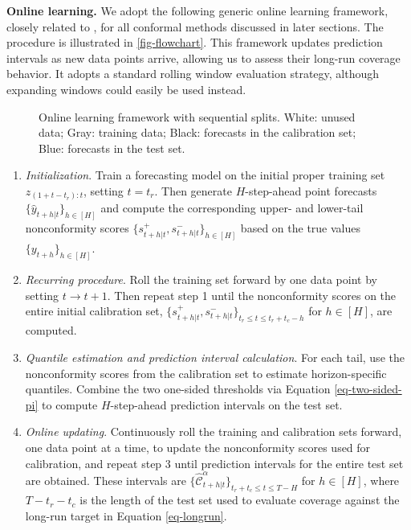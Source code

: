 \documentclass[
  american,
  12pt]{article}
\theoremstyle{plain}
\theoremstyle{plain}
\theoremstyle{remark}
\begin{document}
\textbf{Online learning.} We adopt the following generic online learning
framework, closely related to \citet{zaffran2022}, for all conformal
methods discussed in later sections. The procedure is illustrated in
\autoref{fig-flowchart}. This framework updates prediction intervals as
new data points arrive, allowing us to assess their long-run coverage
behavior. It adopts a standard rolling window evaluation strategy,
although expanding windows could easily be used instead.

\begin{figure}[!hbtp]
\vspace*{-1.5cm}
\hspace*{-2.5cm}
\centering
\scalebox{0.85}{
  
}
\vspace*{-0.5cm}

\caption{Online learning framework with sequential splits. White: unused data; Gray: training data; Black: forecasts in the calibration set; Blue: forecasts in the test set.}\label{fig-flowchart}
\end{figure}

\begin{enumerate}
\def\labelenumi{\arabic{enumi}.}
\item
  \emph{Initialization}. Train a forecasting model on the initial proper
  training set \(z_{(1+t-t_r):t}\), setting \(t=t_r\). Then generate
  \(H\)-step-ahead point forecasts \(\{\hat{y}_{t+h|t}\}_{h\in[H]}\) and
  compute the corresponding upper- and lower-tail nonconformity scores
  \(\{s_{t+h|t}^{+},s_{t+h|t}^{-}\}_{h\in[H]}\) based on the true values
  \(\{y_{t+h}\}_{h\in[H]}\).
\item
  \emph{Recurring procedure}. Roll the training set forward by one data
  point by setting \(t \rightarrow t+1\). Then repeat step 1 until the
  nonconformity scores on the entire initial calibration set,
  \(\{s_{t+h|t}^{+},s_{t+h|t}^{-}\}_{t_r \leq t \leq t_r+t_c-h}\) for
  \(h\in[H]\), are computed.
\item
  \emph{Quantile estimation and prediction interval calculation}. For
  each tail, use the nonconformity scores from the calibration set to
  estimate horizon-specific quantiles. Combine the two one-sided
  thresholds via Equation \eqref{eq-two-sided-pi} to compute
  \(H\)-step-ahead prediction intervals on the test set.
\item
  \emph{Online updating}. Continuously roll the training and calibration
  sets forward, one data point at a time, to update the nonconformity
  scores used for calibration, and repeat step 3 until prediction
  intervals for the entire test set are obtained. These intervals are
  \(\{\hat{\mathcal{C}}_{t+h|t}^{\alpha}\}_{t_r+t_c \leq t \leq T-H}\)
  for \(h \in [H]\), where \(T-t_r-t_c\) is the length of the test set
  used to evaluate coverage against the long-run target in Equation
  \eqref{eq-longrun}.
\end{enumerate}
\end{document}
